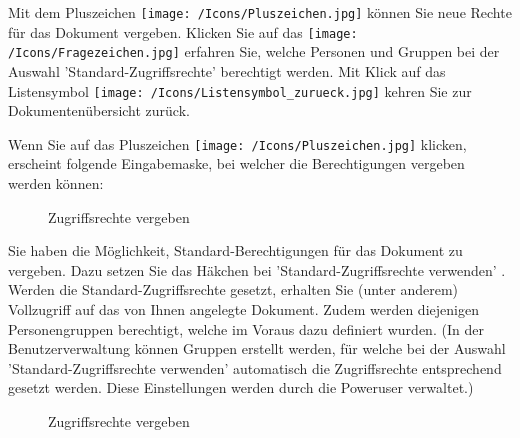 Mit dem Pluszeichen \texttt{[image: /Icons/Pluszeichen.jpg]}  können Sie neue Rechte für das Dokument vergeben. 
Klicken Sie auf das \texttt{[image: /Icons/Fragezeichen.jpg]}  erfahren Sie, welche Personen und Gruppen bei der Auswahl 'Standard-Zugriffsrechte' berechtigt werden. Mit Klick auf das Listensymbol \texttt{[image: /Icons/Listensymbol\_zurueck.jpg]}  kehren Sie zur Dokumentenübersicht zurück.
 
\vspace{\baselineskip}

Wenn Sie auf das Pluszeichen \texttt{[image: /Icons/Pluszeichen.jpg]}  klicken, erscheint folgende Eingabemaske, bei welcher die Berechtigungen vergeben werden können:

\begin{figure}[H]
\caption{Zugriffsrechte vergeben}
\end{figure}

Sie haben die Möglichkeit, Standard-Berechtigungen für das Dokument zu vergeben. Dazu setzen Sie das Häkchen bei 'Standard-Zugriffsrechte verwenden' . Werden die Standard-Zugriffsrechte gesetzt, erhalten Sie (unter anderem) Vollzugriff auf das von Ihnen angelegte Dokument. Zudem werden diejenigen Personengruppen berechtigt, welche im Voraus dazu definiert wurden. (In der Benutzerverwaltung können Gruppen erstellt werden, für welche bei der Auswahl 'Standard-Zugriffsrechte verwenden' automatisch die Zugriffsrechte entsprechend gesetzt werden. Diese Einstellungen werden durch die Poweruser verwaltet.)

\begin{figure}[H]
\caption{Zugriffsrechte vergeben}
\end{figure}

